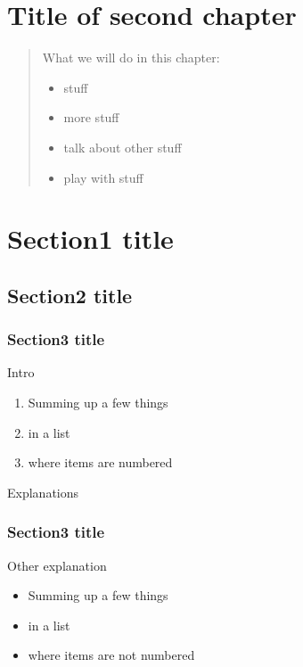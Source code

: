 \section{Title of second chapter}\label{chapux5f02}

\begin{quote}
What we will do in this chapter:

\begin{itemize}
\item
  stuff
\item
  more stuff
\item
  talk about other stuff
\item
  play with stuff
\end{itemize}
\end{quote}

\section{Section1 title}\label{sectux5f02ux5f01}

\subsection{Section2 title}\label{sectux5f02ux5f01ux5f01}

\subsubsection{Section3 title}\label{sectux5f02ux5f01ux5f01ux5f01}

Intro

\begin{enumerate}
\def\labelenumi{\arabic{enumi}.}
\item
  Summing up a few things
\item
  in a list
\item
  where items are numbered
\end{enumerate}

Explanations

\subsubsection{Section3 title}\label{sectux5f02ux5f01ux5f01ux5f01}

Other explanation

\begin{itemize}
\item
  Summing up a few things
\item
  in a list
\item
  where items are not numbered
\end{itemize}

